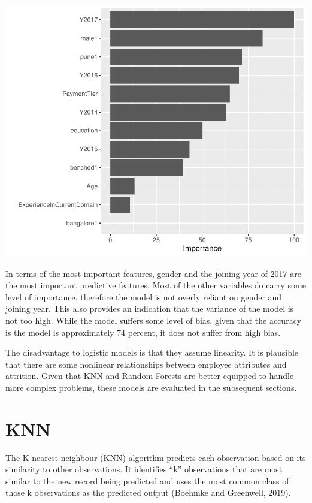 \documentclass[11pt,preprint, authoryear]{elsarticle}
\numberwithin{equation}{section}
\numberwithin{figure}{section}
\numberwithin{table}{section}
\begin{document}
\includegraphics{Final_project_files/figure-latex/Table4-1.pdf}

In terms of the most important features, gender and the joining year of
2017 are the most important predictive features. Most of the other
variables do carry some level of importance, therefore the model is not
overly reliant on gender and joining year. This also provides an
indication that the variance of the model is not too high. While the
model suffers some level of bias, given that the accuracy is the model
is approximately 74 percent, it does not suffer from high bias.

The disadvantage to logistic models is that they assume linearity. It is
plausible that there are some nonlinear relationships between employee
attributes and attrition. Given that KNN and Random Forests are better
equipped to handle more complex problems, these models are evaluated in
the subsequent sections.

\hypertarget{knn}{%
\section*{KNN}\label{knn}}

The K-nearest neighbour (KNN) algorithm predicts each observation based
on its similarity to other observations. It identifies ``k''
observations that are most similar to the new record being predicted and
uses the most common class of those k observations as the predicted
output (Boehmke and Greenwell, 2019).
\end{document}
